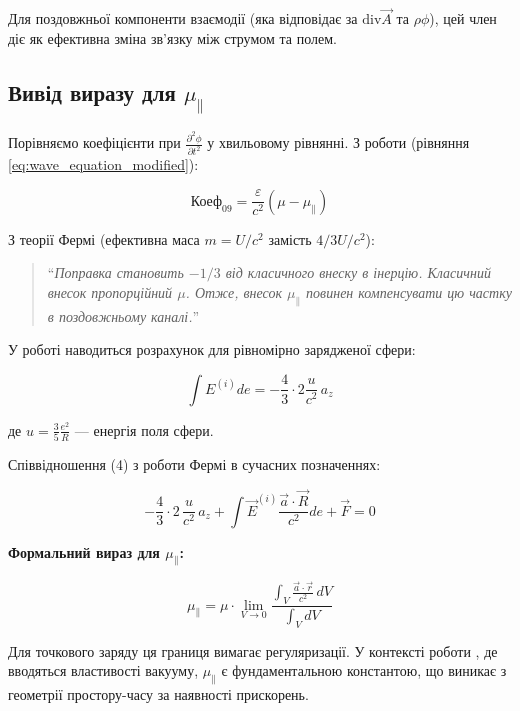 \documentclass[12pt, a4paper]{article}
\begin{document}
Для поздовжньої компоненти взаємодії (яка відповідає за $\text{div} \vec{A}$ та $\rho \phi$), цей член діє як ефективна зміна зв'язку між струмом та полем.

\subsection{Вивід виразу для $\mu_{\parallel}$}

Порівняємо коефіцієнти при $\frac{\partial^2 \phi}{\partial t^2}$ у хвильовому рівнянні. З роботи \cite{NikolaevLorentz} (рівняння \ref{eq:wave_equation_modified}):

\begin{equation}
\text{Коеф}_{09} = \frac{\varepsilon}{c^2} (\mu - \mu_{\parallel})
\label{eq:coefficient_09}
\end{equation}

З теорії Фермі (ефективна маса $m = U/c^2$ замість $4/3 U/c^2$):

\begin{quote}
``\textit{Поправка становить $-1/3$ від класичного внеску в інерцію. Класичний внесок пропорційний $\mu$. Отже, внесок $\mu_{\parallel}$ повинен компенсувати цю частку в поздовжньому каналі.}''
\end{quote}

У роботі \cite{FermiSolution} наводиться розрахунок для рівномірно зарядженої сфери:

\begin{equation}
\int E^{(i)} de = -\frac{4}{3} \cdot 2\frac{u}{c^2}\,a_z
\label{eq:fermi_sphere}
\end{equation}

де $u = \frac{3}{5}\frac{e^2}{R}$ --- енергія поля сфери.

Співвідношення (4) з роботи Фермі в сучасних позначеннях:

\begin{equation}
-\frac{4}{3}\cdot 2 \,\frac{u}{c^2} \, a_z + \int \vec{E}^{(i)}\frac{\vec{a} \cdot \vec{R}}{c^2} de + \vec{F} = 0
\label{eq:fermi_ratio}
\end{equation}

\textbf{Формальний вираз для $\mu_{\parallel}$:}

\begin{equation}
\mu_{\parallel} = \mu \cdot \lim_{V \to 0} \frac{\int_V \frac{\vec{a} \cdot \vec{r}}{c^2} \, dV}{\int_V dV}
\label{eq:mu_parallel_formal}
\end{equation}

Для точкового заряду ця границя вимагає регуляризації. У контексті роботи \cite{NikolaevLorentz}, де вводяться властивості вакууму, $\mu_{\parallel}$ є фундаментальною константою, що виникає з геометрії простору-часу за наявності прискорень.
\end{document}
